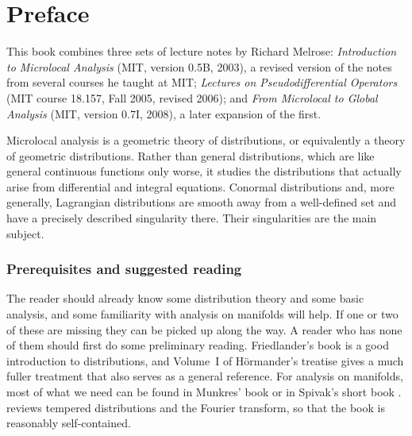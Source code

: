 \chapter*{Preface}
\usetikzlibrary{fit}

This book combines three sets of lecture notes by Richard Melrose:
\emph{Introduction to Microlocal Analysis} (MIT, version 0.5B, 2003), a revised version of
the notes from several courses he taught at MIT; \emph{Lectures on
Pseudodifferential Operators} (MIT course 18.157, Fall 2005, revised 2006); and
\emph{From Microlocal to Global Analysis} (MIT, version 0.7I, 2008), a later expansion of
the first.

Microlocal analysis is a geometric theory of distributions, or equivalently a theory of
geometric distributions. Rather than general distributions, which are like general
continuous functions only worse, it studies the distributions that actually arise from
differential and integral equations. Conormal distributions and, more generally,
Lagrangian distributions are smooth away from a well-defined set and have a
precisely described singularity there. Their singularities are the main subject.

\subsection*{Prerequisites and suggested reading}
The reader should already know some distribution theory and some basic analysis, and
some familiarity with analysis on manifolds will help. If one or two of these are
missing they can be picked up along the way. A reader who has none of them should first
do some preliminary reading. Friedlander's book \cite{Friedlander} is a good
introduction to distributions, and Volume~I of H\"ormander's treatise
\cite{Hormander-I} gives a much fuller treatment that also serves as a general
reference. For analysis on manifolds, most of what we need can be found in Munkres'
book \cite{Munkres} or in Spivak's short book \cite{Spivak}. 
reviews tempered distributions and the Fourier transform, so that the book is
reasonably self-contained.

